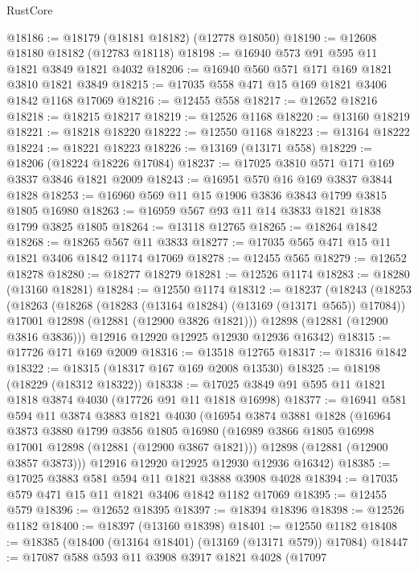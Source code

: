 \begin{lexlean}{RustCore}
\begin{coremodule}
@18186 := @18179 (@18181 @18182) (@12778 @18050)
@18190 := @12608 @18180 @18182 (@12783 @18118)
@18198 := @16940 @573 @91 @595 @11 @1821 @3849 @1821 @4032
@18206 := @16940 @560 @571 @171 @169 @1821 @3810 @1821 @3849
@18215 := @17035 @558 @471 @15 @169 @1821 @3406 @1842 @1168 @17069
@18216 := @12455 @558
@18217 := @12652 @18216
@18218 := @18215 @18217
@18219 := @12526 @1168
@18220 := @13160 @18219
@18221 := @18218 @18220
@18222 := @12550 @1168
@18223 := @13164 @18222
@18224 := @18221 @18223
@18226 := @13169 (@13171 @558)
@18229 := @18206 (@18224 @18226 @17084)
@18237 := @17025 @3810 @571 @171 @169 @3837 @3846 @1821 @2009
@18243 := @16951 @570 @16 @169 @3837 @3844 @1828
@18253 := @16960 @569 @11 @15 @1906 @3836 @3843 @1799 @3815 @1805 @16980
@18263 := @16959 @567 @93 @11 @14 @3833 @1821 @1838 @1799 @3825 @1805
@18264 := @13118 @12765
@18265 := @18264 @1842
@18268 := @18265 @567 @11 @3833
@18277 := @17035 @565 @471 @15 @11 @1821 @3406 @1842 @1174 @17069
@18278 := @12455 @565
@18279 := @12652 @18278
@18280 := @18277 @18279
@18281 := @12526 @1174
@18283 := @18280 (@13160 @18281)
@18284 := @12550 @1174
@18312 := @18237
    (@18243
      (@18253
        (@18263
          (@18268 (@18283 (@13164 @18284) (@13169 (@13171 @565)) @17084))
          @17001
          @12898
          (@12881 (@12900 @3826 @1821)))
        @12898
        (@12881 (@12900 @3816 @3836)))
      @12916
      @12920
      @12925
      @12930
      @12936
      @16342)
@18315 := @17726 @171 @169 @2009
@18316 := @13518 @12765
@18317 := @18316 @1842
@18322 := @18315 (@18317 @167 @169 @2008 @13530)
@18325 := @18198 (@18229 (@18312 @18322))
@18338 := @17025 @3849 @91 @595 @11 @1821 @1818 @3874 @4030 (@17726 @91 @11 @1818 @16998)
@18377 := @16941
    @581
    @594
    @11
    @3874
    @3883
    @1821
    @4030
    (@16954
      @3874
      @3881
      @1828
      (@16964
        @3873
        @3880
        @1799
        @3856
        @1805
        @16980
        (@16989 @3866 @1805 @16998 @17001 @12898 (@12881 (@12900 @3867 @1821)))
        @12898
        (@12881 (@12900 @3857 @3873)))
      @12916
      @12920
      @12925
      @12930
      @12936
      @16342)
@18385 := @17025 @3883 @581 @594 @11 @1821 @3888 @3908 @4028
@18394 := @17035 @579 @471 @15 @11 @1821 @3406 @1842 @1182 @17069
@18395 := @12455 @579
@18396 := @12652 @18395
@18397 := @18394 @18396
@18398 := @12526 @1182
@18400 := @18397 (@13160 @18398)
@18401 := @12550 @1182
@18408 := @18385 (@18400 (@13164 @18401) (@13169 (@13171 @579)) @17084)
@18447 := @17087
    @588
    @593
    @11
    @3908
    @3917
    @1821
    @4028
    (@17097

\end{coremodule}
\end{lexlean}
